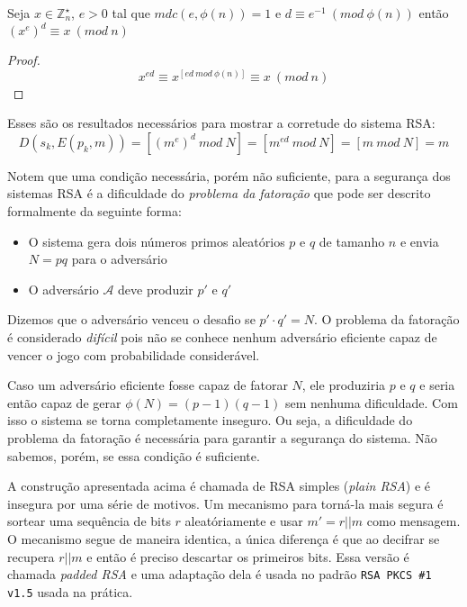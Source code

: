 \begin{corollary}
Seja $x \in \mathbb{Z}_n^\star$, $e > 0$ tal que $mdc(e, \phi(n)) = 1$ e $d \equiv e^{-1}\ (mod\ \phi(n))$ então $(x^e)^d \equiv x\ (mod\ n)$
\end{corollary}

\begin{proof}
  \begin{displaymath}
    x^{ed} \equiv x^{[ed\ mod\ \phi(n)]} \equiv x\ (mod\ n)
  \end{displaymath}
\end{proof}

Esses são os resultados necessários para mostrar a corretude do sistema RSA:
\begin{displaymath}
D(s_k, E(p_k, m)) = [(m^e)^d\ mod\ N] = [m^{ed}\ mod\ N] = [m\ mod\ N] = m  
\end{displaymath}

Notem que uma condição necessária, porém não suficiente, para a segurança dos sistemas RSA é a dificuldade do {\em problema da fatoração} que pode ser descrito formalmente da seguinte forma:
\begin{itemize}
\item O sistema gera dois números primos aleatórios $p$ e $q$ de tamanho $n$ e envia $N = pq$ para o adversário
\item O adversário $\mathcal{A}$ deve produzir $p'$ e $q'$
\end{itemize}

Dizemos que o adversário venceu o desafio se $p' \cdot q' = N$.
O problema da fatoração é considerado {\em difícil} pois não se conhece nenhum adversário eficiente capaz de vencer o jogo com probabilidade considerável.

Caso um adversário eficiente fosse capaz de fatorar $N$, ele produziria $p$ e $q$ e seria então capaz de gerar $\phi(N) = (p-1)(q-1)$ sem nenhuma dificuldade.
Com isso o sistema se torna completamente inseguro.
Ou seja, a dificuldade do problema da fatoração é necessária para garantir a segurança do sistema.
Não sabemos, porém, se essa condição é suficiente.

A construção apresentada acima é chamada de RSA simples ({\em plain RSA}) e é insegura por uma série de motivos.
Um mecanismo para torná-la mais segura é sortear uma sequência de bits $r$ aleatóriamente e usar $m' = r||m$ como mensagem.
O mecanismo segue de maneira identica, a única diferença é que ao decifrar se recupera $r||m$ e então é preciso descartar os primeiros bits.
Essa versão é chamada {\em padded RSA} e uma adaptação dela é usada no padrão {\tt RSA PKCS \#1 v1.5} usada na prática.

